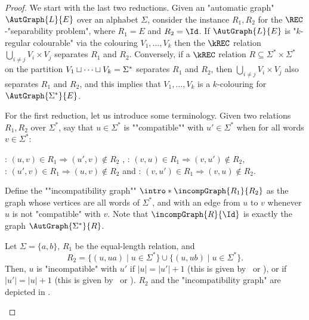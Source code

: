    
\begin{proof}
   We start with the last two reductions.
    Given an "automatic graph" $\AutGraph{L}{E}$ over an alphabet $\Sigma$, consider the instance $R_1,R_2$ for the $\REC$-"separability problem", where 
    $R_1 = E$ and $R_2 = \Id$. 
    If $\AutGraph{L}{E}$ is "$k$-regular colourable" via the colouring $V_1, \dotsc, V_k$ then the $\kREC$ relation
    $\bigcup_{i \neq j} V_i \times V_j$ separates $R_1$ and $R_2$.
    Conversely, if a $\kREC$ relation $R \subseteq \Sigma^* \times \Sigma^*$ on the partition $V_1 \sqcup \dotsb \sqcup V_k = \Sigma^*$ separates $R_1$ and $R_2$, then $\bigcup_{i \neq j} V_i \times V_j$ also separates $R_1$ and $R_2$, and this implies that $V_1, \dotsc, V_k$ is a $k$-colouring for $\AutGraph{\Sigma^*}{E}$.

\AP For the first reduction, let us introduce some terminology.
Given two relations $R_1,R_2$ over $\Sigma^*$, say that $u \in \Sigma^*$ is ""compatible"" with
$u' \in \Sigma^*$ when for all words $v \in \Sigma^*$:
\begin{center}
    \intro*\compL: $(u,v) \in R_1 \Rightarrow (u',v) \not\in R_2$%
    ,\hphantom{\quad and \quad}
    \intro*\compR: $(v,u) \in R_1 \Rightarrow (v,u') \not\in R_2$,\\
    \intro*\compLpr: $(u',v) \in R_1 \Rightarrow (u,v) \not\in R_2$%
    \hphantom{,}\quad and \quad
    \intro*\compRpr: $(v,u') \in R_1 \Rightarrow (v,u) \not\in R_2$.
\end{center}
\AP
Define the ""incompatibility graph"" $\intro*\incompGraph{R_1}{R_2}$
as the graph whose vertices are all words of $\Sigma^*$,
and with an edge from $u$ to $v$ whenever $u$ is not "compatible" with $v$.
Note that $\incompGraph{R}{\Id}$ is exactly the graph $\AutGraph{\Sigma^*}{R}$.

\begin{example}
	\AP\label{ex:equal_length_plusone}
	Let $\Sigma = \{a,b\}$, $R_1$ be the equal-length relation,
	and
	\[
		R_2 = \{(u, ua) \mid u \in \Sigma^*\} \cup \{(u, ub) \mid u \in \Sigma^*\}.
	\]
	Then, $u$ is "incompatible" with $u'$ if $|u| = |u'|+1$ (this is given by \compL~or \compR),
	or if $|u'| = |u|+1$ (this is given by \compLpr~or \compRpr).
	$R_2$ and the "incompatibility graph" are depicted in .
	

\end{example}
\end{proof}
